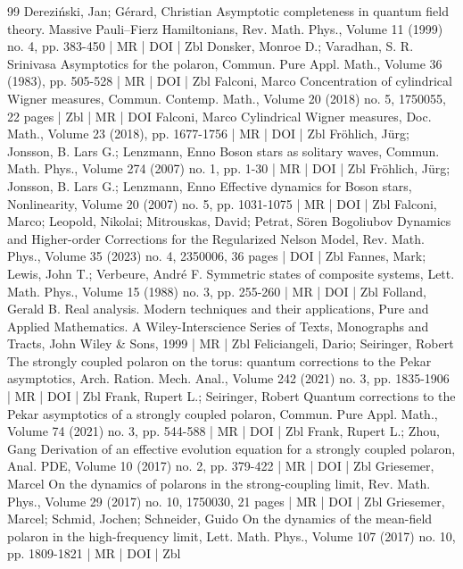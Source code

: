 \documentclass[10pt]{amsart}
\theoremstyle{definition}\newtheorem{defi}[theo]{Definition}\newtheorem{rema}[theo]{Remark}\newtheorem{exam}[theo]{Example}\newtheorem{exem}[theo]{Example}\newtheorem{nota}[theo]{Notation}
\newcommand{\1}{\mathds{1}}
\begin{document}
\begin{thebibliography}{99}
 Dereziński, Jan; Gérard, Christian Asymptotic completeness in quantum field theory. Massive Pauli–Fierz Hamiltonians, Rev. Math. Phys., Volume 11 (1999) no. 4, pp. 383-450 | MR | DOI | Zbl
 Donsker, Monroe D.; Varadhan, S. R. Srinivasa Asymptotics for the polaron, Commun. Pure Appl. Math., Volume 36 (1983), pp. 505-528 | MR | DOI | Zbl
 Falconi, Marco Concentration of cylindrical Wigner measures, Commun. Contemp. Math., Volume 20 (2018) no. 5, 1750055, 22 pages | Zbl | MR | DOI
 Falconi, Marco Cylindrical Wigner measures, Doc. Math., Volume 23 (2018), pp. 1677-1756 | MR | DOI | Zbl
 Fröhlich, Jürg; Jonsson, B. Lars G.; Lenzmann, Enno Boson stars as solitary waves, Commun. Math. Phys., Volume 274 (2007) no. 1, pp. 1-30 | MR | DOI | Zbl
 Fröhlich, Jürg; Jonsson, B. Lars G.; Lenzmann, Enno Effective dynamics for Boson stars, Nonlinearity, Volume 20 (2007) no. 5, pp. 1031-1075 | MR | DOI | Zbl
 Falconi, Marco; Leopold, Nikolai; Mitrouskas, David; Petrat, Sören Bogoliubov Dynamics and Higher-order Corrections for the Regularized Nelson Model, Rev. Math. Phys., Volume 35 (2023) no. 4, 2350006, 36 pages | DOI | Zbl
 Fannes, Mark; Lewis, John T.; Verbeure, André F. Symmetric states of composite systems, Lett. Math. Phys., Volume 15 (1988) no. 3, pp. 255-260 | MR | DOI | Zbl
 Folland, Gerald B. Real analysis. Modern techniques and their applications, Pure and Applied Mathematics. A Wiley-Interscience Series of Texts, Monographs and Tracts, John Wiley \& Sons, 1999 | MR | Zbl
 Feliciangeli, Dario; Seiringer, Robert The strongly coupled polaron on the torus: quantum corrections to the Pekar asymptotics, Arch. Ration. Mech. Anal., Volume 242 (2021) no. 3, pp. 1835-1906 | MR | DOI | Zbl
 Frank, Rupert L.; Seiringer, Robert Quantum corrections to the Pekar asymptotics of a strongly coupled polaron, Commun. Pure Appl. Math., Volume 74 (2021) no. 3, pp. 544-588 | MR | DOI | Zbl
 Frank, Rupert L.; Zhou, Gang Derivation of an effective evolution equation for a strongly coupled polaron, Anal. PDE, Volume 10 (2017) no. 2, pp. 379-422 | MR | DOI | Zbl
 Griesemer, Marcel On the dynamics of polarons in the strong-coupling limit, Rev. Math. Phys., Volume 29 (2017) no. 10, 1750030, 21 pages | MR | DOI | Zbl
 Griesemer, Marcel; Schmid, Jochen; Schneider, Guido On the dynamics of the mean-field polaron in the high-frequency limit, Lett. Math. Phys., Volume 107 (2017) no. 10, pp. 1809-1821 | MR | DOI | Zbl

\end{thebibliography}
\end{document}
